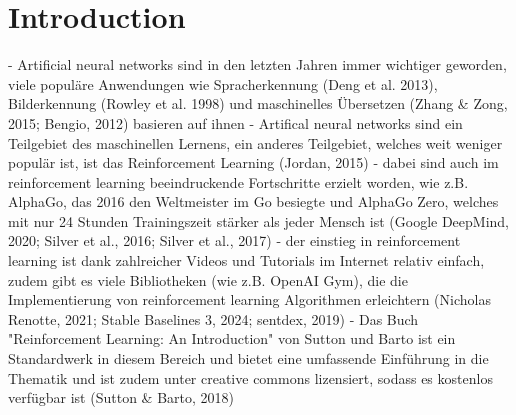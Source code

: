 \chapter{Introduction}

- Artificial neural networks sind in den letzten Jahren immer wichtiger geworden, viele populäre Anwendungen wie Spracherkennung (Deng et al. 2013), Bilderkennung (Rowley et al. 1998) und maschinelles Übersetzen (Zhang & Zong, 2015; Bengio, 2012) basieren auf ihnen
- Artifical neural networks sind ein Teilgebiet des maschinellen Lernens, ein anderes Teilgebiet, welches weit weniger populär ist, ist das Reinforcement Learning (Jordan, 2015)
- dabei sind auch im reinforcement learning beeindruckende Fortschritte erzielt worden, wie z.B. AlphaGo, das 2016 den Weltmeister im Go besiegte und AlphaGo Zero, welches mit nur 24 Stunden Trainingszeit stärker als jeder Mensch ist (Google DeepMind, 2020; Silver et al., 2016; Silver et al., 2017)
- der einstieg in reinforcement learning ist dank zahlreicher Videos und Tutorials im Internet relativ einfach, zudem gibt es viele Bibliotheken (wie z.B. OpenAI Gym), die die Implementierung von reinforcement learning Algorithmen erleichtern (Nicholas Renotte, 2021; Stable Baselines 3, 2024; sentdex, 2019)
- Das Buch "Reinforcement Learning: An Introduction" von Sutton und Barto ist ein Standardwerk in diesem Bereich und bietet eine umfassende Einführung in die Thematik und ist zudem unter creative commons lizensiert, sodass es kostenlos verfügbar ist (Sutton & Barto, 2018)

